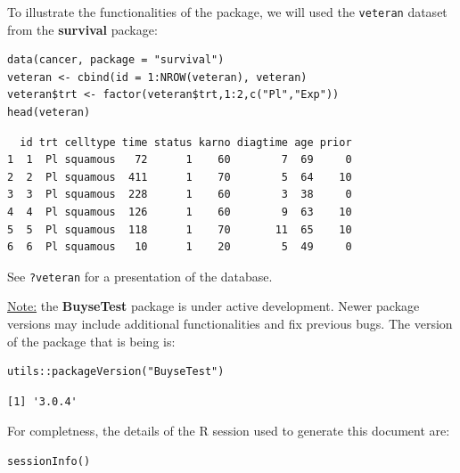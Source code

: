 \documentclass[12pt]{article}
\begin{document}
To illustrate the functionalities of the package, we will used the
\texttt{veteran} dataset from the \textbf{survival} package:
\lstset{language=r,label= ,caption= ,captionpos=b,numbers=none}
\begin{lstlisting}
data(cancer, package = "survival")
veteran <- cbind(id = 1:NROW(veteran), veteran)
veteran$trt <- factor(veteran$trt,1:2,c("Pl","Exp"))
head(veteran)
\end{lstlisting}

\begin{verbatim}
  id trt celltype time status karno diagtime age prior
1  1  Pl squamous   72      1    60        7  69     0
2  2  Pl squamous  411      1    70        5  64    10
3  3  Pl squamous  228      1    60        3  38     0
4  4  Pl squamous  126      1    60        9  63    10
5  5  Pl squamous  118      1    70       11  65    10
6  6  Pl squamous   10      1    20        5  49     0
\end{verbatim}


See \texttt{?veteran} for a presentation of the database.

\bigskip

\uline{Note:} the \textbf{BuyseTest} package is under active development. Newer
package versions may include additional functionalities and fix
previous bugs. The version of the package that is being is:
\lstset{language=r,label= ,caption= ,captionpos=b,numbers=none}
\begin{lstlisting}
utils::packageVersion("BuyseTest")
\end{lstlisting}

\begin{verbatim}
[1] '3.0.4'
\end{verbatim}


For completness, the details of the R session used to generate this
document are:
\lstset{language=r,label= ,caption= ,captionpos=b,numbers=none}
\begin{lstlisting}
sessionInfo()
\end{lstlisting}
\end{document}
